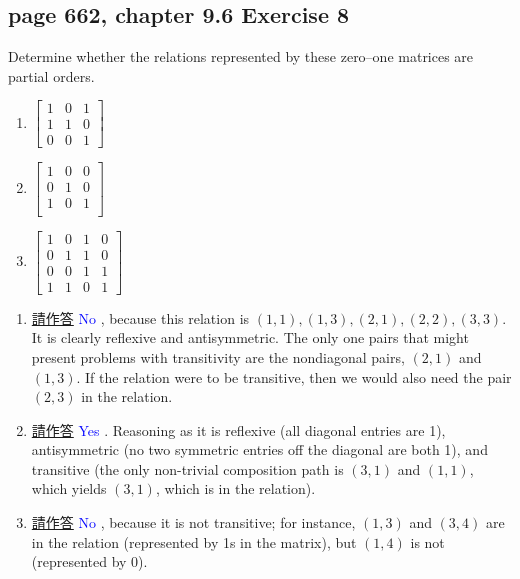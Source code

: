 \documentclass[sigconf]{acmart}
\newcommand{\answer}[2]{%
  \if\relax\detokenize{#2}\relax
    \underline{\mbox{請作答}}%
  \else
    \textcolor{blue}{#2}%
  \fi
}
\begin{document}
\subsection{page 662, chapter 9.6 Exercise 8}
\begin{shaded}
     Determine whether the relations represented by these zero–one matrices are partial orders.
    \begin{enumerate}[label=(\alph*)]
        \item 
        $
        \begin{bmatrix}
           1 & 0 & 1 \\
           1 & 1 & 0 \\
           0 & 0 & 1
        \end{bmatrix}
        $
        \item 
        $
        \begin{bmatrix}
           1 & 0 & 0 \\
           0 & 1 & 0 \\
           1 & 0 & 1 \\
        \end{bmatrix}
        $
        \item 
        $
        \begin{bmatrix}
           1 & 0 & 1 & 0 \\
           0 & 1 & 1 & 0 \\
           0 & 0 & 1 & 1 \\
           1 & 1 & 0 & 1
        \end{bmatrix}
        $
    \end{enumerate}
\end{shaded}
\begin{enumerate}[label=(\alph*)]
    \item \answer{9.6.8a}{No}, because this relation is $(1, 1), (1, 3), (2, 1), (2, 2), (3, 3)$. It is clearly reflexive and antisymmetric. The only one pairs that might present problems with transitivity are the nondiagonal pairs, $(2, 1)$ and $(1, 3)$. If the relation were to be transitive, then we would also need the pair $(2, 3)$ in the relation.
    \item \answer{9.6.8b}{Yes}. Reasoning as it is reflexive (all diagonal entries are 1), antisymmetric (no two symmetric entries off the diagonal are both 1), and transitive (the only non-trivial composition path is $(3,1)$ and $(1,1)$, which yields $(3,1)$, which is in the relation).
    \item \answer{9.6.8c}{No}, because it is not transitive; for instance, $(1, 3)$ and $(3, 4)$ are in the relation (represented by 1s in the matrix), but $(1, 4)$ is not (represented by 0).
\end{enumerate}
\end{document}
